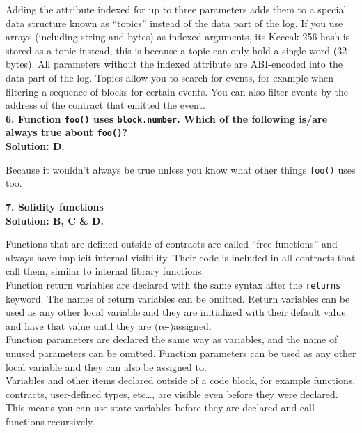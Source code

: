 Adding the attribute indexed for up to three parameters adds them to a special data structure known as ``topics'' instead of the data part of the log.
If you use arrays (including string and bytes) as indexed arguments, its Keccak-256 hash is stored as a topic instead, this is because a topic can only hold a single word (32 bytes).
All parameters without the indexed attribute are ABI-encoded into the data part of the log.
Topics allow you to search for events, for example when filtering a sequence of blocks for certain events.
You can also filter events by the address of the contract that emitted the event.\\

\textbf{6. Function \texttt{foo()} uses \texttt{block.number}. Which of the following is/are always true about \texttt{foo()}?}\label{sec:exam2_q6}\\

\textbf{Solution: D.}

Because it wouldn't always be true unless you know what other things \verb|foo()| uses too.\\

\pagebreak

\textbf{7. Solidity functions}\label{sec:exam2_q7}\\

\textbf{Solution: B, C \& D.}

Functions that are defined outside of contracts are called ``free functions'' and always have implicit internal visibility.
Their code is included in all contracts that call them, similar to internal library functions.\\

Function return variables are declared with the same syntax after the \verb|returns| keyword.
The names of return variables can be omitted.
Return variables can be used as any other local variable and they are initialized with their default value and have that value until they are (re-)assigned.\\

Function parameters are declared the same way as variables, and the name of unused parameters can be omitted.
Function parameters can be used as any other local variable and they can also be assigned to.\\

Variables and other items declared outside of a code block, for example functions, contracts, user-defined types, etc\dots, are visible even before they were declared.
This means you can use state variables before they are declared and call functions recursively.\\

